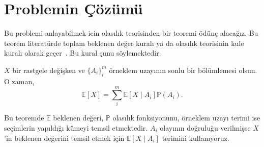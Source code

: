 \section{Problemin \c{C}\"{o}z\"{u}m\"{u}}
\label{sec:solution}

Bu problemi anlayabilmek icin olas{\i}l{\i}k teorisinden bir teoremi
\"{o}d\"{u}n\c{c} alaca\u{g}{\i}z. Bu teorem literat\"{u}rde toplam beklenen
de\u{g}er kural{\i} ya da olas{\i}l{\i}k teorisinin kule kural{\i} olarak
ge\c{c}er~\cite{bertsekas2002introduction}. Bu kural \c{s}unu s\"{o}ylemektedir.

\begin{thm} \label{thm:kule}
    $X$ bir rastgele de\u{g}i\c{s}ken ve $\{A_i\}_i^m$ \"{o}rneklem
    uzay{\i}n{\i}n sonlu bir b\"{o}l\"{u}mlemesi olsun. O zaman, 
    \[ \mathbb{E}[X] = \sum_i^m \mathbb{E}\left[ X \mid A_i \right]
    \mathbb{P}(A_i). \]
\end{thm}
%
\noindent Bu teoremde $\mathbb{E}$ beklenen de\u{g}eri, $\mathbb{P}$
olas{\i}l{\i}k fonksiyonunu, \"{o}rneklem uzay{\i} terimi ise se\c{c}imlerin
yap{\i}ld{\i}\u{g}{\i} k\"{u}meyi temsil etmektedir. $A_i$ olay{\i}n{\i}n
do\u{g}rulu\u{g}u verilmi\c{s}se $X$'in beklenen de\u{g}erini temsil etmek
i\c{c}in $\mathbb{E}\left[ X \mid A_i \right]$ terimini kullan{\i}yoruz.

